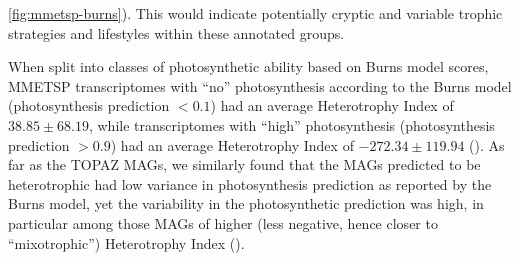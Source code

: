 \documentclass[12pt]{article}
\numberwithin{equation}{section}
\begin{document}
\ref{fig:mmetsp-burns}). This would indicate potentially cryptic and variable trophic strategies and lifestyles within these annotated groups. 

When split into classes of photosynthetic ability based on Burns model scores, MMETSP transcriptomes with ``no'' photosynthesis according to the Burns model (photosynthesis prediction $<0.1$) had an average Heterotrophy Index of $38.85\pm68.19$, while transcriptomes with ``high'' photosynthesis (photosynthesis prediction $>0.9$) had an average Heterotrophy Index of $-272.34\pm119.94$ (). As far as the TOPAZ MAGs, we similarly found that the MAGs predicted to be heterotrophic had low variance in photosynthesis prediction as reported by the Burns model, yet the variability in the photosynthetic prediction was high, in particular among those MAGs of higher (less negative, hence closer to ``mixotrophic'') Heterotrophy Index (). 
\end{document}
